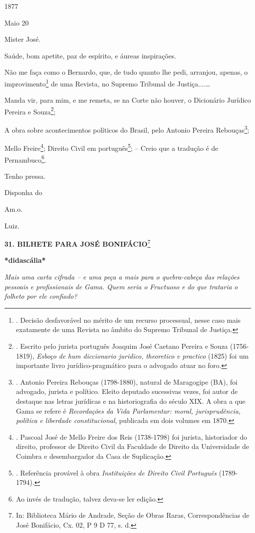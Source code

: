 1877

Maio 20

Mister José.

Saúde, bom apetite, paz de espírito, e áureas inspirações.

Não me faça como o Bernardo, que, de tudo quanto lhe pedi, arranjou,
apenas, o improvimento\footnote{. Decisão desfavorável no mérito de um
  recurso processual, nesse caso mais exatamente de uma Revista no
  âmbito do Supremo Tribunal de Justiça.} de uma Revista, no Supremo
Tribunal de Justiça....\ldots{}

Manda vir, para mim, e me remeta, se na Corte não houver, o Dicionário
Jurídico Pereira e Souza\footnote{. Escrito pelo jurista português
  Joaquim José Caetano Pereira e Souza (1756-1819), \emph{Esboço de hum
  diccionario juridico, theoretico e practico} (1825) foi um importante
  livro jurídico-pragmático para o advogado atuar no foro.};

A obra sobre acontecimentos políticos do Brasil, pelo Antonio Pereira
Rebouças\footnote{. Antonio Pereira Rebouças (1798-1880), natural de
  Maragogipe (BA), foi advogado, jurista e político. Eleito deputado
  sucessivas vezes, foi autor de destaque nas letras jurídicas e na
  historiografia do século XIX. A obra a que Gama se refere é
  \emph{Recordações da Vida Parlamentar: moral, jurisprudência, política
  e liberdade constitucional}, publicada em dois volumes em 1870.};

Mello Freire\footnote{. Pascoal José de Mello Freire dos Reis
  (1738-1798) foi jurista, historiador do direito, professor de Direito
  Civil da Faculdade de Direito da Universidade de Coimbra e
  desembargador da Casa de Suplicação.}; Direito Civil em
português\footnote{. Referência provável à obra \emph{Instituições de
  Direito Civil Português} (1789-1794).}; -- Creio que a tradução é de
Pernambuco\footnote{Ao invés de tradução, talvez deva-se ler edição.}.

Tenho pressa.

Disponha do

Am.o.

Luiz.

\textbf{31. BILHETE PARA JOSÉ BONIFÁCIO}\footnote{In: Biblioteca Mário
  de Andrade, Seção de Obras Raras, Correspondências de José Bonifácio,
  Cx. 02, P 9 D 77, s. d.}

\textbf{*didascália*}

\emph{Mais uma carta cifrada -- e uma peça a mais para o quebra-cabeça
das relações pessoais e profissionais de Gama. Quem seria o Fructuoso e
do que trataria o folheto por ele confiado? }

